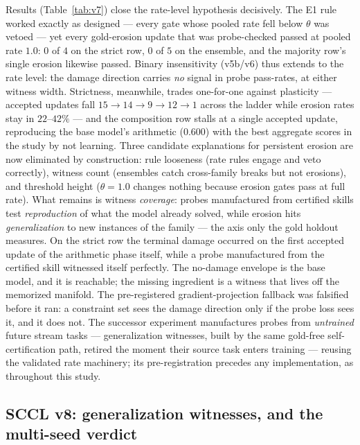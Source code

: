 \documentclass[10pt,conference]{IEEEtran}
\begin{document}
Results (Table~\ref{tab:v7}) close the rate-level hypothesis decisively. The E1 rule worked exactly as designed --- every gate whose pooled rate fell below $\theta$ was vetoed --- yet every gold-erosion update that was probe-checked passed at pooled rate $1.0$: $0$ of $4$ on the strict row, $0$ of $5$ on the ensemble, and the majority row's single erosion likewise passed. Binary insensitivity (v5b/v6) thus extends to the rate level: the damage direction carries \emph{no} signal in probe pass-rates, at either witness width. Strictness, meanwhile, trades one-for-one against plasticity --- accepted updates fall $15\to14\to9\to12\to1$ across the ladder while erosion rates stay in $22$--$42\%$ --- and the composition row stalls at a single accepted update, reproducing the base model's arithmetic ($0.600$) with the best aggregate scores in the study by not learning. Three candidate explanations for persistent erosion are now eliminated by construction: rule looseness (rate rules engage and veto correctly), witness count (ensembles catch cross-family breaks but not erosions), and threshold height ($\theta=1.0$ changes nothing because erosion gates pass at full rate). What remains is witness \emph{coverage}: probes manufactured from certified skills test \emph{reproduction} of what the model already solved, while erosion hits \emph{generalization} to new instances of the family --- the axis only the gold holdout measures. On the strict row the terminal damage occurred on the first accepted update of the arithmetic phase itself, while a probe manufactured from the certified skill witnessed itself perfectly. The no-damage envelope is the base model, and it is reachable; the missing ingredient is a witness that lives off the memorized manifold. The pre-registered gradient-projection fallback was falsified before it ran: a constraint set sees the damage direction only if the probe loss sees it, and it does not. The successor experiment manufactures probes from \emph{untrained} future stream tasks --- generalization witnesses, built by the same gold-free self-certification path, retired the moment their source task enters training --- reusing the validated rate machinery; its pre-registration precedes any implementation, as throughout this study.

\subsection*{SCCL v8: generalization witnesses, and the multi-seed verdict}
\label{sec:v8}
\end{document}
